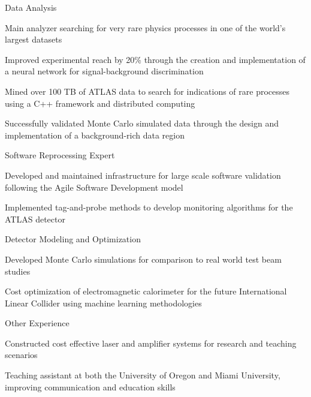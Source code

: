 
\begin{cventries}
  \cventry
    {Data Analysis} %
    {} %
    {} %
    {} %
    {
      \begin{cvitems} %
        \item {Main analyzer searching for very rare physics processes in one of the world's largest datasets}
        \item {Improved experimental reach by 20\% through the creation and implementation of a neural network for signal-background discrimination}
        \item {Mined over 100 TB of ATLAS data to search for indications of rare processes using a C++ framework and distributed computing}
         \item{Successfully validated Monte Carlo simulated data through the design and implementation of a background-rich data region}
      \end{cvitems}
    } 
    \cventry
    {Software Reprocessing Expert} %
    {} %
    {} %
    {} %
    {
      \begin{cvitems} %
        \item {Developed and maintained infrastructure for large scale software validation following the Agile Software Development model }
        \item {Implemented tag-and-probe methods to develop monitoring algorithms for the ATLAS detector}
      \end{cvitems}
    }     
    \cventry
    {Detector Modeling and Optimization}
    {}
    {}
    {}
    {
    \begin{cvitems}
    	\item Developed Monte Carlo simulations for comparison to real world test beam studies
    	\item Cost optimization of electromagnetic calorimeter for the future International Linear Collider using machine learning methodologies
    \end{cvitems}
    }
    \cventry
    {Other Experience} %
    {} %
    {} %
    {} %
    {
      \begin{cvitems} %
        \item {Constructed cost effective laser and amplifier systems for research and teaching scenarios}
        \item {Teaching assistant at both the University of Oregon and Miami University, improving communication and education skills}
      \end{cvitems}
    }    


\end{cventries}

